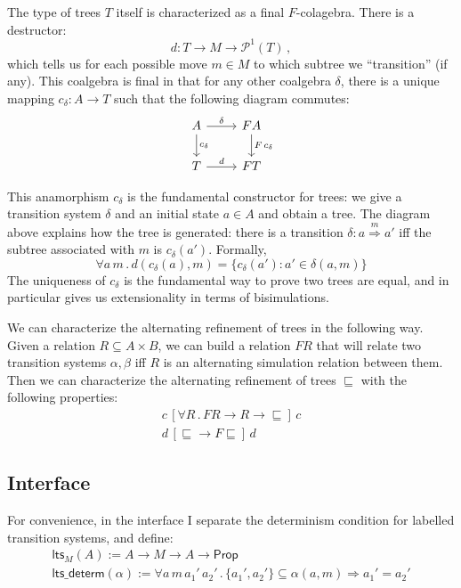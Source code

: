 \documentclass[11pt]{article}
\newcommand{\kw}[1]{{\mathsf{#1}}}
\begin{document}
The type of trees $T$ itself is characterized as a final $F$-colagebra.
There is a destructor:
\[ d : T \rightarrow M \rightarrow \mathcal{P}^1(T) \, , \]
which tells us for each possible move $m \in M$
to which subtree we ``transition'' (if any).
This coalgebra is final in that for any other coalgebra $\delta$,
there is a unique mapping $c_{\delta} : A \rightarrow T$
such that the following diagram commutes:
\[
  \begin{tikzcd}
    A \arrow[r, "\delta"]
      \arrow[d, "c_{\delta}"] &
    F A \arrow[d, "F \, c_\delta"] \\
    T \arrow[r, "d"] &
    F T
  \end{tikzcd}
\]

This anamorphism $c_\delta$ is
the fundamental constructor for trees:
we give a transition system $\delta$ and an initial state $a \in A$
and obtain a tree.
The diagram above explains how the tree is generated:
there is a transition $\delta : a \stackrel{m}{\Longrightarrow} a'$ iff
the subtree associated with $m$ is $c_{\delta}(a')$.
Formally,
\[
  \forall a \, m \,.\,
    d(c_{\delta}(a), m) = \{ c_{\delta}(a') : a' \in \delta(a, m) \}
\]
The uniqueness of $c_\delta$ is
the fundamental way to prove two trees are equal,
and in particular gives us extensionality
in terms of bisimulations.

We can characterize the alternating refinement of trees
in the following way.
Given a relation $R \subseteq A \times B$,
we can build a relation $F R$ that will relate
two transition systems $\alpha, \beta$ iff
$R$ is an alternating simulation relation between them.
Then we can characterize the alternating refinement of trees $\sqsubseteq$
with the following properties:
\begin{gather*}
  c \, [\forall R \, . \, F R \rightarrow R \rightarrow {\sqsubseteq}] \, c \\
  d \, [{\sqsubseteq} \rightarrow F {\sqsubseteq}] \, d
\end{gather*}

\subsection{Interface}

For convenience,
in the interface I separate the determinism condition
for labelled transition systems, and define:
\begin{gather*}
  \kw{lts}_M(A) :=
    A \rightarrow M \rightarrow A \rightarrow \kw{Prop} \\
  \kw{lts\_determ}(\alpha) :=
    \forall a \, m \, a_1' \, a_2' \,.\,
      \{ a_1', a_2' \} \subseteq \alpha(a, m) \Rightarrow
      a_1' = a_2'
\end{gather*}
\end{document}
